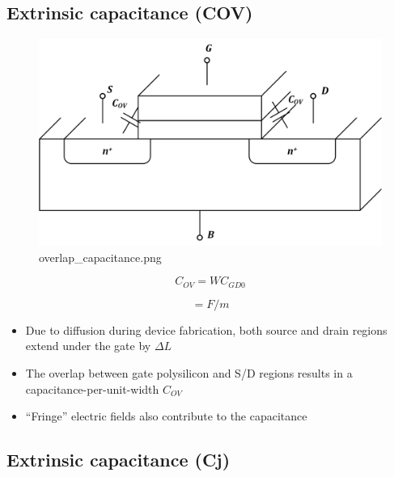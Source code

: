 \documentclass[11pt]{article}
\providecommand{\tightlist}{%
      \setlength{\itemsep}{0pt}\setlength{\parskip}{0pt}}
\begin{document}
    \hypertarget{extrinsic-capacitance-cov}{%
\subsection{Extrinsic capacitance
(COV)}\label{extrinsic-capacitance-cov}}

    \begin{figure}
\centering
\includegraphics{overlap_capacitance.png}
\caption{overlap\_capacitance.png}
\end{figure}

    \begin{equation}
\boxed{C_{OV} = WC_{GD0}}
\end{equation}

\begin{equation}
[C_{GD0}] = F/m
\end{equation}

    \begin{itemize}
\tightlist
\item
  Due to diffusion during device fabrication, both source and drain
  regions extend under the gate by \(\Delta L\)
\item
  The overlap between gate polysilicon and S/D regions results in a
  capacitance-per-unit-width \(C_{OV}\)
\item
  ``Fringe'' electric fields also contribute to the capacitance
\end{itemize}

    \hypertarget{extrinsic-capacitance-cj}{%
\subsection{Extrinsic capacitance (Cj)}\label{extrinsic-capacitance-cj}}
\end{document}
